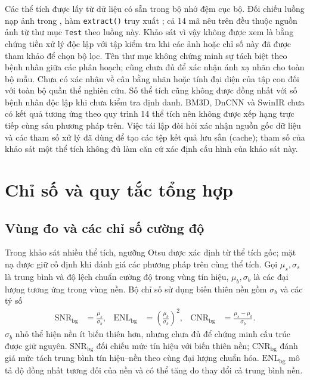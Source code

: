 \documentclass[14pt,a4paper,oneside]{extreport}
\begin{document}
Các thể tích được lấy từ dữ liệu có sẵn trong bộ nhớ đệm cục bộ.
Đối chiếu luồng nạp ảnh trong , hàm
\texttt{extract()} truy xuất ; cả 14 mã nêu trên
đều thuộc nguồn ảnh từ thư mục \texttt{Test} theo luồng này. Khảo sát vì vậy
không được xem là bằng chứng tiền xử lý độc lập với tập kiểm tra khi các
ảnh hoặc chỉ số này đã được tham khảo để chọn bộ lọc. Tên thư mục không
chứng minh sự tách biệt theo bệnh nhân giữa các phân hoạch; cũng chưa đủ
để xác nhận ánh xạ nhãn cho toàn bộ mẫu. Chưa có xác nhận về cân bằng nhãn hoặc tính đại diện của tập con
đối với toàn bộ quần thể nghiên cứu. Số thể tích cũng không được
đồng nhất với số bệnh nhân độc lập khi chưa kiểm tra định danh.
BM3D, DnCNN và SwinIR chưa có kết quả tương ứng theo quy trình
14 thể tích nên không được xếp hạng trực tiếp cùng sáu phương pháp
trên. Việc tái lập đòi hỏi xác nhận nguồn gốc dữ liệu và các tham số
xử lý đã dùng để tạo các tệp kết quả lưu sẵn (cache); tham số của khảo sát
một thể tích không đủ làm căn cứ xác định cấu hình của khảo sát này.

\section{Chỉ số và quy tắc tổng hợp}
\label{sec:denoise-14-metrics}
\subsection{Vùng đo và các chỉ số cường độ}
Trong khảo sát nhiều thể tích, ngưỡng Otsu được xác định từ thể
tích gốc; mặt nạ được giữ cố định khi đánh giá các phương pháp
trên cùng thể tích. Gọi $\mu_s,\sigma_s$ là trung bình và độ lệch
chuẩn cường độ trong vùng tín hiệu, $\mu_b,\sigma_b$ là các đại
lượng tương ứng trong vùng nền. Bộ chỉ số sử dụng biến thiên nền
gồm $\sigma_b$ và các tỷ số
\begin{align}
 \mathrm{SNR}_{\mathrm{bg}}&=\frac{\mu_s}{\sigma_b},&
 \mathrm{ENL}_{\mathrm{bg}}&=\left(\frac{\mu_b}{\sigma_b}\right)^2,&
 \mathrm{CNR}_{\mathrm{bg}}&=\frac{\mu_s-\mu_b}{\sigma_b}.
 \label{eq:denoise-bg-metrics}
\end{align}
$\sigma_b$ nhỏ thể hiện nền ít biến thiên hơn, nhưng chưa đủ để
chứng minh cấu trúc được giữ nguyên. $\mathrm{SNR}_{\mathrm{bg}}$
đối chiếu mức tín hiệu với biến thiên nền; $\mathrm{CNR}_{\mathrm{bg}}$
đánh giá mức tách trung bình tín hiệu--nền theo cùng đại lượng
chuẩn hóa. $\mathrm{ENL}_{\mathrm{bg}}$ mô tả độ đồng nhất tương
đối của nền và có thể tăng do thay đổi cả trung bình nền.
\end{document}
